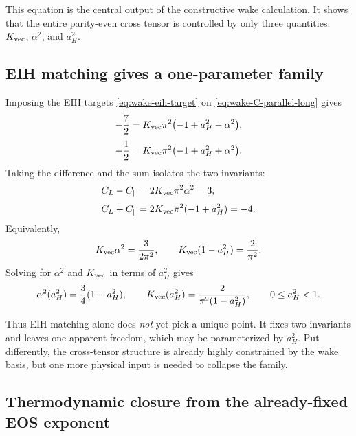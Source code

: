 \documentclass[11pt]{article}
\begin{document}
This equation is the central output of the constructive wake calculation. It shows that
the entire parity-even cross tensor is controlled by only three quantities:
\(K_{\rm vec}\), \(\alpha^2\), and \(a_H^2\).

\subsection{EIH matching gives a one-parameter family}
\label{sec:wake-family}

Imposing the EIH targets \eqref{eq:wake-eih-target} on
\eqref{eq:wake-C-parallel-long} gives
\begin{align}
-\frac72
&=
K_{\rm vec}\pi^2\bigl(-1+a_H^2-\alpha^2\bigr),
\label{eq:wake-match-para}
\\[3pt]
-\frac12
&=
K_{\rm vec}\pi^2\bigl(-1+a_H^2+\alpha^2\bigr).
\label{eq:wake-match-long}
\end{align}
Taking the difference and the sum isolates the two invariants:
\begin{align}
C_L-C_\parallel
&=
2K_{\rm vec}\pi^2\alpha^2
=
3,
\label{eq:wake-difference}
\\[3pt]
C_L+C_\parallel
&=
2K_{\rm vec}\pi^2(-1+a_H^2)
=
-4.
\label{eq:wake-sum}
\end{align}
Equivalently,
\begin{equation}
K_{\rm vec}\alpha^2=\frac{3}{2\pi^2},
\qquad
K_{\rm vec}(1-a_H^2)=\frac{2}{\pi^2}.
\label{eq:wake-invariants}
\end{equation}
Solving for \(\alpha^2\) and \(K_{\rm vec}\) in terms of \(a_H^2\) gives
\begin{equation}
\alpha^2(a_H^2)=\frac34(1-a_H^2),
\qquad
K_{\rm vec}(a_H^2)=\frac{2}{\pi^2(1-a_H^2)},
\qquad
0\le a_H^2<1.
\label{eq:wake-family}
\end{equation}

Thus EIH matching alone does \emph{not} yet pick a unique point. It fixes two invariants
and leaves one apparent freedom, which may be parameterized by \(a_H^2\). Put
differently, the cross-tensor structure is already highly constrained by the wake basis,
but one more physical input is needed to collapse the family.

\subsection{Thermodynamic closure from the already-fixed EOS exponent}
\label{sec:wake-thermo}
\end{document}
